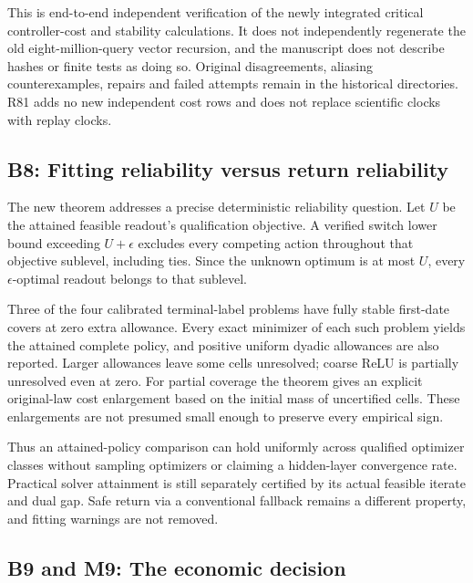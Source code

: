 This is end-to-end independent verification of the newly integrated
critical controller-cost and stability calculations. It does not
independently regenerate the old eight-million-query vector recursion,
and the manuscript does not describe hashes or finite tests as doing so.
Original disagreements, aliasing counterexamples, repairs and failed
attempts remain in the historical directories. R81 adds no new
independent cost rows and does not replace scientific clocks with replay
clocks.

\hypertarget{b8-fitting-reliability-versus-return-reliability}{%
\subsection{B8: Fitting reliability versus return
reliability}\label{b8-fitting-reliability-versus-return-reliability}}

The new theorem addresses a precise deterministic reliability question.
Let \(U\) be the attained feasible readout's qualification objective. A
verified switch lower bound exceeding \(U+\epsilon\) excludes every
competing action throughout that objective sublevel, including ties.
Since the unknown optimum is at most \(U\), every \(\epsilon\)-optimal
readout belongs to that sublevel.

Three of the four calibrated terminal-label problems have fully stable
first-date covers at zero extra allowance. Every exact minimizer of each
such problem yields the attained complete policy, and positive uniform
dyadic allowances are also reported. Larger allowances leave some cells
unresolved; coarse ReLU is partially unresolved even at zero. For
partial coverage the theorem gives an explicit original-law cost
enlargement based on the initial mass of uncertified cells. These
enlargements are not presumed small enough to preserve every empirical
sign.

Thus an attained-policy comparison can hold uniformly across qualified
optimizer classes without sampling optimizers or claiming a hidden-layer
convergence rate. Practical solver attainment is still separately
certified by its actual feasible iterate and dual gap. Safe return via a
conventional fallback remains a different property, and fitting warnings
are not removed.

\hypertarget{b9-and-m9-the-economic-decision}{%
\subsection{B9 and M9: The economic
decision}\label{b9-and-m9-the-economic-decision}}

